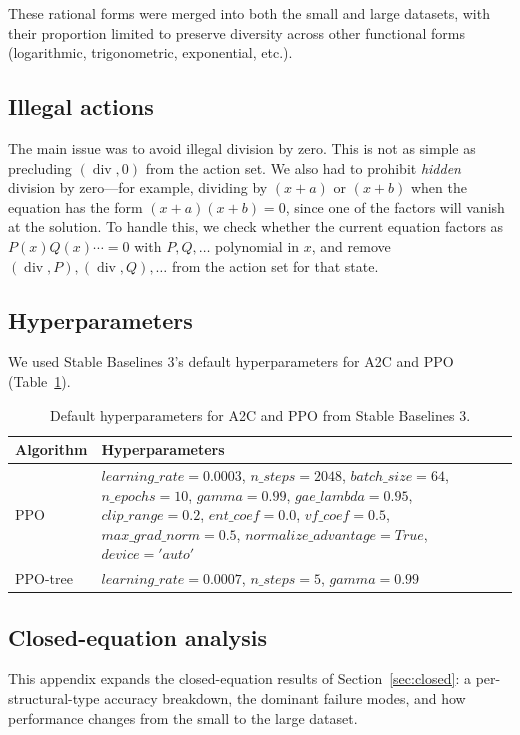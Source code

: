 \documentclass{article}
\theoremstyle{plain}
\theoremstyle{definition}
\theoremstyle{remark}
\newcommand{\op}[1]{\operatorname{#1}}
\begin{document}
These rational forms were merged into both the small and large datasets, with their proportion limited to preserve diversity across other functional forms (logarithmic, trigonometric, exponential, etc.).

\subsection{Illegal actions}
The main issue was to avoid illegal division by zero. This is not as simple as precluding $(\op{div}, 0)$ from the action set. We also had to prohibit \emph{hidden} division by zero---for example, dividing by $(x+a)$ or $(x+b)$ when the equation has the form $(x+a)(x+b) = 0$, since one of the factors will vanish at the solution. To handle this, we check whether the current equation factors as $P(x) Q(x) \cdots = 0$ with $P, Q, \dots$ polynomial in $x$, and remove $(\op{div}, P), (\op{div}, Q), \dots$ from the action set for that state.

\subsection{Hyperparameters}
We used Stable Baselines 3's default hyperparameters for A2C and PPO (Table~\ref{hyperparams}).

\begin{table}[h]
\small
\centering
\begin{tabular}{l p{}}
\toprule
\textbf{Algorithm} & \textbf{Hyperparameters} \\
\midrule
PPO & \(learning\_rate=0.0003\), \(n\_steps=2048\), \(batch\_size=64\), \(n\_epochs=10\), \(gamma=0.99\), \(gae\_lambda=0.95\), \(clip\_range=0.2\), \(ent\_coef=0.0\), \(vf\_coef=0.5\), \(max\_grad\_norm=0.5\), \(normalize\_advantage=True\), \(device='auto'\) \\
PPO-tree & \(learning\_rate=0.0007\), \(n\_steps=5\), \(gamma=0.99\) \\
\bottomrule
\end{tabular}
\caption{Default hyperparameters for A2C and PPO from Stable Baselines 3.}
\label{hyperparams}
\end{table}


\subsection{Closed-equation analysis}
\label{app:closed_analysis}

This appendix expands the closed-equation results of Section~\ref{sec:closed}: a per-structural-type accuracy breakdown, the dominant failure modes, and how performance changes from the small to the large dataset.
\end{document}

